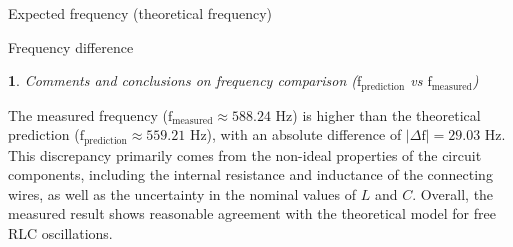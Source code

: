 \documentclass[12pt,twoside,a4paper]{article}
\theoremstyle{definition}
\newtheorem{bt}{}
\begin{document}
	Expected frequency (theoretical frequency)
	\begin{center}
	\end{center}
	
	Frequency difference
	\begin{center}
	\end{center}
	
	\begin{bt}
		\textit{Comments and conclusions on frequency comparison ($\text{f}_{\text{prediction}}$ vs $\text{f}_{\text{measured}}$)}
		
		\vspace{0.2cm}
		The measured frequency ($\text{f}_{\text{measured}} \approx 588.24\text{ Hz}$) is higher than the theoretical prediction ($\text{f}_{\text{prediction}} \approx 559.21\text{ Hz}$), with an absolute difference of $\left|\Delta \text{f}\right| = 29.03\text{ Hz}$.   This discrepancy primarily comes from the non-ideal properties of the circuit components, including the internal resistance and inductance of the connecting wires, as well as the uncertainty in the nominal values of $L$ and $C$. Overall, the measured result shows reasonable agreement with the theoretical model for free RLC oscillations.
	\end{bt}
	
\end{document}
